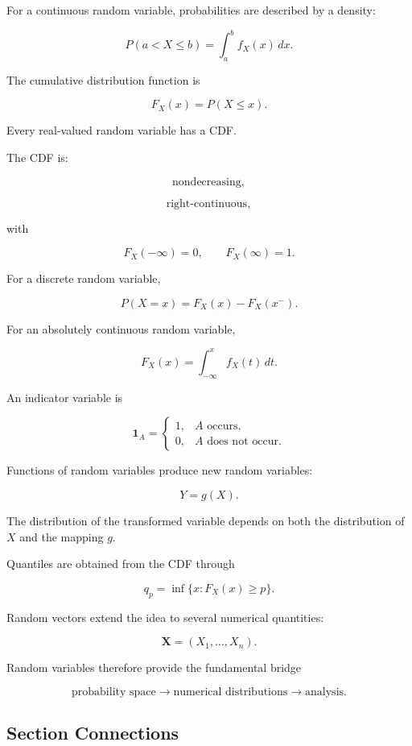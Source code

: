 For a continuous random variable, probabilities are described by a
density:

\[
\boxed{
P(a<X\leq b)
=
\int_a^b f_X(x)\,dx.
}
\]

The cumulative distribution function is

\[
\boxed{
F_X(x)=P(X\leq x).
}
\]

Every real-valued random variable has a CDF.

The CDF is:

\[
\boxed{
\text{nondecreasing},
}
\]

\[
\boxed{
\text{right-continuous},
}
\]

with

\[
\boxed{
F_X(-\infty)=0,
\qquad
F_X(\infty)=1.
}
\]

For a discrete random variable,

\[
\boxed{
P(X=x)
=
F_X(x)-F_X(x^-).
}
\]

For an absolutely continuous random variable,

\[
\boxed{
F_X(x)
=
\int_{-\infty}^{x}f_X(t)\,dt.
}
\]

An indicator variable is

\[
\boxed{
\mathbf{1}_A
=
\begin{cases}
1,&A\text{ occurs},\\
0,&A\text{ does not occur}.
\end{cases}
}
\]

Functions of random variables produce new random variables:

\[
\boxed{
Y=g(X).
}
\]

The distribution of the transformed variable depends on both the
distribution of \(X\) and the mapping \(g\).

Quantiles are obtained from the CDF through

\[
\boxed{
q_p
=
\inf\{x:F_X(x)\geq p\}.
}
\]

Random vectors extend the idea to several numerical quantities:

\[
\boxed{
\mathbf{X}
=
(X_1,\ldots,X_n).
}
\]

Random variables therefore provide the fundamental bridge

\[
\boxed{
\text{probability space}
\longrightarrow
\text{numerical distributions}
\longrightarrow
\text{analysis}.
}
\]

\subsection{Section Connections}
\label{subsec:random-variable-connections}

